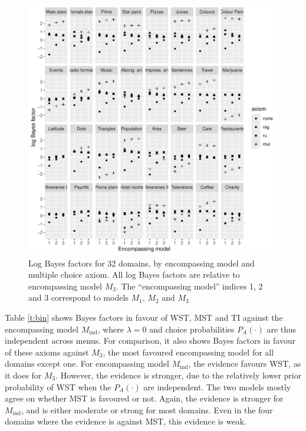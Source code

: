 \documentclass[11pt,letter]{article}
\newcommand{\menus}{menus}
\begin{document}
\begin{figure}
	\begin{center}
	\includegraphics[width=16cm]{Figures/multiple_BF}
	\caption{Log Bayes factors for 32 domains, by encompassing model and multiple choice axiom. All log Bayes factors are relative to encompassing model $M_3$. The ``encompassing model'' indices 1, 2 and 3 correspond to models $M_1$, $M_2$ and $M_3$}\label{f:multiple_BF}
	\end{center}
\end{figure}

Table \ref{t:bin} shows Bayes factors in favour of WST, MST and TI against the encompassing model $M_{\mathrm{ind}}$, where $\lambda = 0$ and choice probabilities $P_A(\cdot)$ are thus independent across \menus{}.
For comparison, it also shows Bayes factors in favour of these axioms against $M_3$, the most favoured encompassing model for all domains except one.
For encompassing model $M_{\mathrm{ind}}$, the evidence favours WST, as it does for $M_3$.
However, the evidence is stronger, due to the relatively lower prior probability of WST when the $P_A(\cdot)$ are independent.
The two models mostly agree on whether MST is favoured or not.
Again, the evidence is stronger for $M_{\mathrm{ind}}$, and is either moderate or strong for most domains.
Even in the four domains where the evidence is against MST, this evidence is weak.
\end{document}
